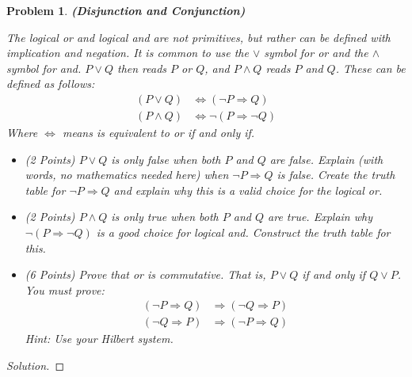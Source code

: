 \documentclass{article}
\theoremstyle{normal}
\newtheorem{problem}{Problem}
\begin{document}
    \begin{problem}
        \textbf{(Disjunction and Conjunction)}
        \par\hfill\par
        The \textit{logical or} and \textit{logical and} are not primitives,
        but rather can be defined with implication and negation.
        It is common to use the
        $\lor$ symbol for \textit{or} and the $\land$ symbol for \textit{and}.
        $P\lor{Q}$ then reads $P$ \textit{or} $Q$, and $P\land{Q}$ reads
        $P$ \textit{and} $Q$. These can be defined as follows:
        \begin{align}
            (P\lor{Q})&\Leftrightarrow(\neg{P}\Rightarrow{Q})\\
            (P\land{Q})&\Leftrightarrow\neg(P\Rightarrow\neg{Q})
        \end{align}
        Where $\Leftrightarrow$ means \textit{is equivalent to} or
        \textit{if and only if}.
        \begin{itemize}
            \item (2 Points) $P\lor{Q}$ is only false when both $P$ and $Q$ are
                false. Explain (with words, no mathematics needed here) when
                $\neg{P}\Rightarrow{Q}$ is false. Create the truth table for
                $\neg{P}\Rightarrow{Q}$ and explain why this is a valid choice
                for the logical or.
            \item (2 Points) $P\land{Q}$ is only true when both $P$ and $Q$ are
                true. Explain why $\neg(P\Rightarrow\neg{Q})$ is a good choice
                for logical and. Construct the truth table for this.
            \item (6 Points) Prove that \textit{or} is commutative. That is,
                $P\lor{Q}$ if and only if $Q\lor{P}$. You must prove:
                \begin{align}
                    (\neg{P}\Rightarrow{Q})&\Rightarrow(\neg{Q}\Rightarrow{P})\\
                    (\neg{Q}\Rightarrow{P})&\Rightarrow(\neg{P}\Rightarrow{Q})
                \end{align}
                Hint: Use your Hilbert system.
        \end{itemize}
    \end{problem}
    \color{black}
    \begin{proof}[Solution]
    \end{proof}
    \newpage
    \color{blue}
\end{document}
